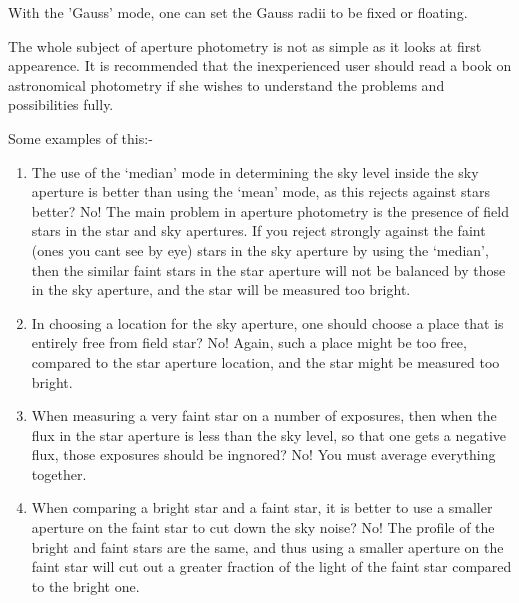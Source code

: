 {{   With the 'Gauss' mode, one can set the Gauss radii to be fixed or
   floating.
                                                                               
   The whole subject of aperture photometry is not as simple as
   it looks at first appearence. It is recommended that the
   inexperienced user should read a book on astronomical photometry
   if she wishes to understand the problems and possibilities fully.
                                                                               
   Some examples of this:-

\begin{enumerate}
                                                                               
\item The use of the `median' mode in determining the sky level
      inside the sky aperture is better than using the `mean'
      mode, as this rejects against stars better? No! The main
      problem in aperture photometry is the presence of field stars
      in the star and sky apertures. If you reject strongly against
      the faint (ones you cant see by eye) stars in the sky
      aperture by using the `median', then the similar faint stars
      in the star aperture will not be balanced by those in the
      sky aperture, and the star will be measured too bright.
                                                                               
\item In choosing a location for the sky aperture, one should
      choose a place that is entirely free from field star? No!
      Again, such a place might be too free, compared to the star
      aperture location, and the star might be measured too bright.
                                                                               
\item When measuring a very faint star on a number of exposures,
      then when the flux in the star aperture is less than the
      sky level, so that one gets a negative flux, those exposures
      should be ingnored? No! You must average everything together.
                                                                               
\item When comparing a bright star and a faint star, it is better
      to use a smaller aperture on the faint star to cut down the
      sky noise? No! The profile of the bright and faint stars are
      the same, and thus using a smaller aperture on the faint
      star will cut out a greater fraction of the light of the
      faint star compared to the bright one.
                                                                               

\end{enumerate}}}
